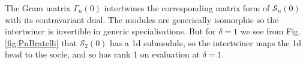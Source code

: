 \documentclass[reqno,10pt,a4paper]{amsart}
\newcommand{\red}[1]{\textcolor{red}{#1}}
\newcommand{\ppm}[1]{\red{#1}}
\newcommand{\cell}{\mathcal{S}}
\newcommand{\SSS}{\mathcal{S}} %
\newcommand{\Gram}{\Gamma}
\begin{document}
\newcommand{\bassoo}[1]{
\mat %
#1 (1)(2)(3) \\ #1 (12)(3) \\ #1 (13)(2) \\ #1 (1)(23) \\ #1 (123) \tam
}
\newcommand{\basss}{
\mat %
\delta^3 & \delta^2 & \delta^2 & \delta^2 & \delta\\
\delta^2 & \delta^2 & \delta & \delta & \delta\\
\delta^2 & \delta & \delta^2 & \delta & \delta\\
\delta^2 & \delta & \delta & \delta^2 & \delta\\
\delta & \delta & \delta & \delta & \delta\\
\tam %
}




\mdef The Gram matrix $\Gram_n(0)$ intertwines 
the corresponding matrix form of 
$\SSS_n(0)$ with its contravariant dual.
The modules are generically isomorphic so the intertwiner is invertible
in generic specialisations.
But for $\delta=1$ we see from Fig.\ref{fig:PnBratelli} that 
$\SSS_2(0)$
has a 1d submodule, so the intertwiner maps the 1d head to the socle, and so has
rank 1 on evaluation at $\delta = 1$.
\end{document}
